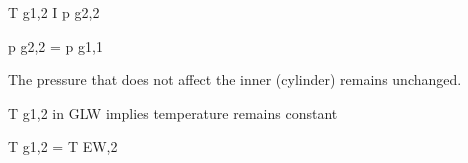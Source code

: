 T g1,2 I p g2,2

p g2,2 = p g1,1

The pressure that does not affect the inner (cylinder) remains unchanged.

T g1,2 in GLW implies temperature remains constant

T g1,2 = T EW,2